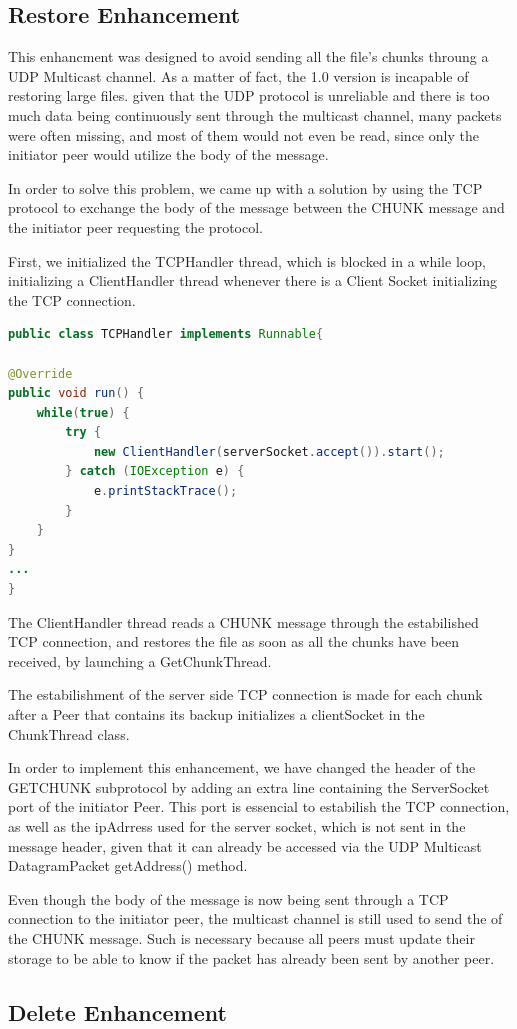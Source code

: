 \documentclass[11pt]{article}
\begin{document}
\subsection{Restore Enhancement}

This enhancment was designed to avoid sending all the file's chunks throung a UDP Multicast channel. As a matter of fact, the 1.0 version is incapable of restoring large files.
given that the UDP protocol is unreliable and there is too much data being continuously sent through the multicast channel, many packets were often missing, and most of them would not even be read,
since only the initiator peer would utilize the body of the message.

In order to solve this problem, we came up with a solution by using the TCP protocol to exchange the body of the message between the CHUNK message and the initiator peer requesting the protocol.

First, we initialized the TCPHandler thread, which is blocked in a while loop, initializing a ClientHandler thread whenever there is a Client Socket initializing the TCP connection.

\begin{lstlisting}[language=java]
public class TCPHandler implements Runnable{

@Override
public void run() {
	while(true) {
		try {
			new ClientHandler(serverSocket.accept()).start();
		} catch (IOException e) {
			e.printStackTrace();
		}
	}
}
...
}
\end{lstlisting}

The ClientHandler thread reads a CHUNK message through the estabilished TCP connection, and restores the file as soon as all the chunks have been received, by launching a GetChunkThread.

The estabilishment of the server side TCP connection is made for each chunk after a Peer that contains its backup initializes a clientSocket in the ChunkThread class.

In order to implement this enhancement, we have changed the header of the GETCHUNK subprotocol by adding an extra line containing the ServerSocket port of the initiator Peer.
This port is essencial to estabilish the TCP connection, as well as the ipAdrress used for the server socket, which is not sent in the message header, given that it can already be accessed
via the UDP Multicast DatagramPacket getAddress() method.

Even though the body of the message is now being sent through a TCP connection to the initiator peer, the multicast channel is still used to send the of the 
CHUNK message. Such is necessary because all peers must update their storage to be able to know if the packet has already been sent by another peer.



\subsection{Delete Enhancement}




	
\end{document}
